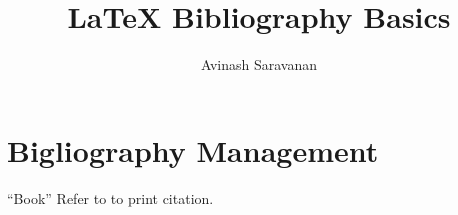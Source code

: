 \documentclass{article}
\author{Avinash Saravanan}
\title{{\LaTeX} Bibliography Basics}
\begin{document}
\maketitle

\section {Bigliography Management}

``Book''
Refer to \cite{book} to print citation.




\end{document}
